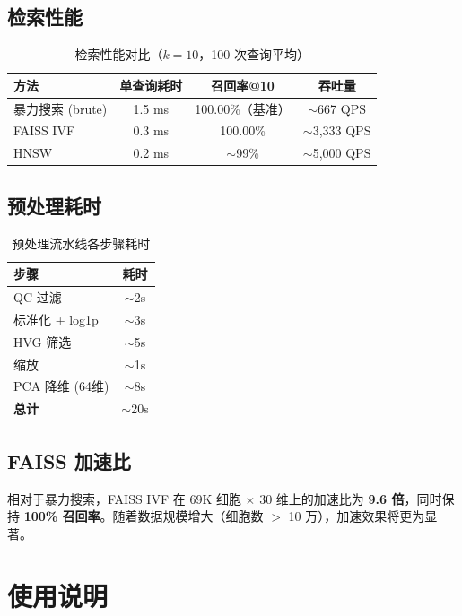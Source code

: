 \documentclass[12pt,a4paper]{ctexart}
\begin{document}
\subsection{检索性能}

\begin{table}[H]
\centering
\caption{检索性能对比（$k=10$，100 次查询平均）}
\begin{tabular}{l|c|c|c}
\toprule
\textbf{方法}   & \textbf{单查询耗时} & \textbf{召回率@10} & \textbf{吞吐量} \\
\midrule
暴力搜索 (brute) & 1.5 ms  & 100.00\%（基准） & $\sim$667 QPS \\
FAISS IVF        & 0.3 ms  & 100.00\%         & $\sim$3,333 QPS \\
HNSW             & 0.2 ms  & $\sim$99\%       & $\sim$5,000 QPS \\
\bottomrule
\end{tabular}
\end{table}

\subsection{预处理耗时}

\begin{table}[H]
\centering
\caption{预处理流水线各步骤耗时}
\begin{tabular}{l|c}
\toprule
\textbf{步骤} & \textbf{耗时} \\
\midrule
QC 过滤         & $\sim$2s  \\
标准化 + log1p  & $\sim$3s  \\
HVG 筛选        & $\sim$5s  \\
缩放            & $\sim$1s  \\
PCA 降维 (64维) & $\sim$8s  \\
\midrule
\textbf{总计}   & $\sim$20s  \\
\bottomrule
\end{tabular}
\end{table}

\subsection{FAISS 加速比}

相对于暴力搜索，FAISS IVF 在 69K 细胞 $\times$ 30 维上的加速比为 \textbf{9.6 倍}，同时保持 \textbf{100\% 召回率}。随着数据规模增大（细胞数 $>$ 10 万），加速效果将更为显著。

\section{使用说明}
\end{document}
